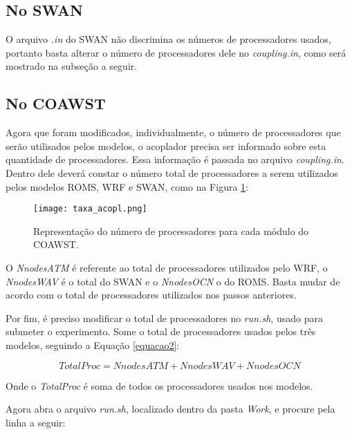 \subsection{No SWAN}

\bigskip O arquivo \textit{.in} do SWAN não discrimina os números de processadores usados, portanto basta alterar o número
        de processadores dele no \textit{coupling.in}, como será mostrado na subseção a seguir.
\bigskip

\subsection{No COAWST}
\bigskip

\noindent Agora que foram modificados, individualmente, o número de processadores que serão utilisados pelos modelos, 
          o acoplador precisa ser informado sobre esta quantidade de processadores. Essa informação é passada no arquivo \textit{coupling.in}.
          Dentro dele deverá constar o número total de processadores a serem utilizados pelos modelos ROMS, WRF e SWAN, como
          na Figura \textcolor{bleu_cite}{\ref{procscoa}}:
\bigskip

\begin{figure}[H]
    \centering
    \texttt{[image: taxa\_acopl.png]}
    \caption{Representação do número de processadores para cada módulo do COAWST.}
    \label{procscoa}
\end{figure}
\bigskip

\noindent O \textit{NnodesATM} é referente ao total de processadores utilizados pelo WRF, o \textit{NnodesWAV} é o 
          total do SWAN e o \textit{NnodesOCN} o do ROMS. Basta mudar de acordo com o total de processadores utilizados 
          nos passos anteriores.
\bigskip

\noindent Por fim, é preciso modificar o total de processadores no \textit{run.sh}, usado para submeter o experimento. 
          Some o total de processadores usados pelos três modelos, seguindo a Equação \textcolor{bleu_cite}{\ref{equacao2}}:
\bigskip

\begin{equation}
TotalProc = NnodesATM + NnodesWAV + NnodesOCN
\label{equacao2}
\end{equation}
\bigskip

\noindent Onde o \textit{TotalProc} é soma de todos os processadores usados nos modelos.
\bigskip

\noindent Agora abra o arquivo \textit{run.sh}, localizado dentro da pasta \textit{Work}, e procure pela linha a seguir:
\bigskip

